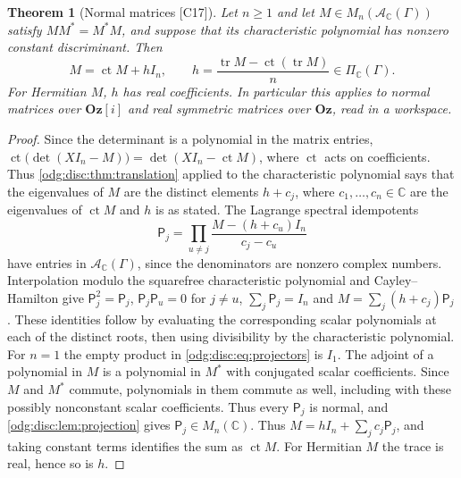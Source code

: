 \documentclass[11pt,oneside]{article}
\numberwithin{equation}{section}
\newtheorem{theorem}{Theorem}[section]
\theoremstyle{definition}
\theoremstyle{remark}
\newcommand{\Oz}{\mathbf{Oz}}
\newcommand{\C}{\mathbb C}
\newcommand{\ct}{\operatorname{ct}}
\newcommand{\tr}{\operatorname{tr}}
\newcommand{\src}[1]{\textup{\textsf{\small[#1]}}}
\newcommand{\Og}{\Oz[i]}
\begin{document}
\begin{theorem}[Normal matrices \src{C17}]\label{odg:disc:thm:matrix}
Let $n\ge1$ and let $M\in M_n(\mathcal A_\C(\Gamma))$ satisfy $MM^*=M^*M$, and suppose that its
characteristic polynomial has nonzero constant discriminant. Then
\begin{equation}\label{odg:disc:eq:matrix}
 M=\ct M+hI_n,\qquad h=\frac{\tr M-\ct(\tr M)}{n}\in\Pi_\C(\Gamma).
\end{equation}
For Hermitian $M$, $h$ has real coefficients. In particular this applies to normal
matrices over $\Og$ and real symmetric matrices over $\Oz$, read in a workspace.
\end{theorem}
\begin{proof}
Since the determinant is a polynomial in the matrix entries,
$\ct\bigl(\det(XI_n-M)\bigr)=\det(XI_n-\ct M)$, where $\ct$ acts on coefficients.
Thus \cref{odg:disc:thm:translation} applied to the characteristic polynomial says that
the eigenvalues of $M$ are the distinct
elements $h+c_j$, where $c_1,\ldots,c_n\in\C$ are the eigenvalues of $\ct M$ and $h$ is as
stated. The Lagrange spectral idempotents
\begin{equation}\label{odg:disc:eq:projectors}
 \mathsf P_j=\prod_{u\ne j}\frac{M-(h+c_u)I_n}{c_j-c_u}
\end{equation}
have entries in $\mathcal A_\C(\Gamma)$, since the denominators are nonzero complex
numbers. Interpolation modulo the squarefree characteristic polynomial and Cayley--Hamilton
give $\mathsf P_j^2=\mathsf P_j$, $\mathsf P_j\mathsf P_u=0$ for $j\ne u$,
$\sum_j\mathsf P_j=I_n$ and $M=\sum_j(h+c_j)\mathsf P_j$. These identities follow by
evaluating the corresponding scalar polynomials at each of the distinct roots, then
using divisibility by the characteristic polynomial. For $n=1$ the empty product in
\eqref{odg:disc:eq:projectors} is $I_1$.
The adjoint of a polynomial in $M$ is a polynomial in $M^*$ with conjugated
scalar coefficients.
Since $M$ and $M^*$ commute, polynomials in them commute as well, including with these
possibly nonconstant scalar coefficients. Thus every $\mathsf P_j$ is
normal, and \cref{odg:disc:lem:projection} gives $\mathsf P_j\in M_n(\C)$. Thus
$M=hI_n+\sum_jc_j\mathsf P_j$, and taking constant terms identifies the sum as $\ct M$.
For Hermitian $M$ the trace is real, hence so is $h$.
\end{proof}
\end{document}
